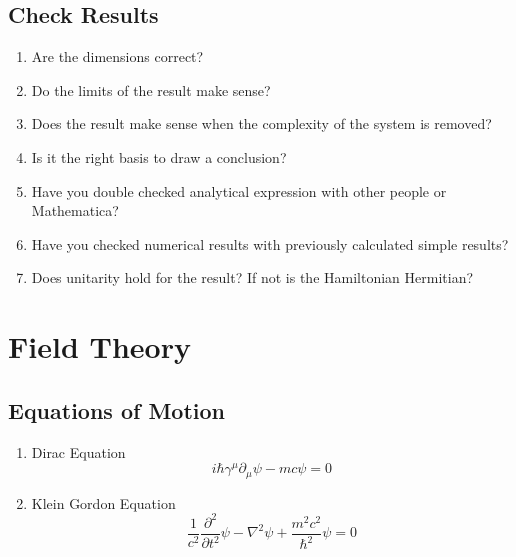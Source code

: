 \documentclass{sciposter}
\begin{document}
\begin{multicols}{3}
\begin{enumerate}
\end{enumerate}




\subsection{Check Results}

\begin{enumerate}
    \item Are the dimensions correct?
    \item Do the limits of the result make sense?
    \item Does the result make sense when the complexity of the system is removed?
    \item Is it the right basis to draw a conclusion?
    \item Have you double checked analytical expression with other people or Mathematica?
    \item Have you checked numerical results with previously calculated simple results?
    \item Does unitarity hold for the result? If not is the Hamiltonian Hermitian?
\end{enumerate}








\section{Field Theory}


\subsection{Equations of Motion}

\begin{enumerate}
\item Dirac Equation
\begin{equation}
i\hbar \gamma^\mu \partial_\mu \psi - m c \psi = 0
\end{equation}
\item Klein Gordon Equation
\begin{equation}
\frac {1}{c^2} \frac{\partial^2}{\partial t^2} \psi - \nabla^2 \psi + \frac {m^2 c^2}{\hbar^2} \psi = 0
\end{equation}
\end{enumerate}






\end{multicols}
\end{document}
